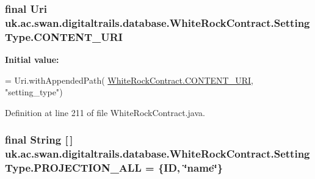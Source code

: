 \hypertarget{classuk_1_1ac_1_1swan_1_1digitaltrails_1_1database_1_1_white_rock_contract_1_1_setting_type_a3041c935f6d354bc72de5e4b1867aa3d}{
\subsubsection[{C\+O\+N\+T\+E\+N\+T\+\_\+\+U\+R\+I}]{\setlength{\rightskip}{0pt plus 5cm}final Uri uk.\+ac.\+swan.\+digitaltrails.\+database.\+White\+Rock\+Contract.\+Setting\+Type.\+C\+O\+N\+T\+E\+N\+T\+\_\+\+U\+R\+I\hspace{0.3cm}{\ttfamily [static]}}}\label{classuk_1_1ac_1_1swan_1_1digitaltrails_1_1database_1_1_white_rock_contract_1_1_setting_type_a3041c935f6d354bc72de5e4b1867aa3d}
{\bfseries Initial value\+:}
\begin{DoxyCode}
= Uri.withAppendedPath(
                \hyperlink{classuk_1_1ac_1_1swan_1_1digitaltrails_1_1database_1_1_white_rock_contract_abfe96759bfe16773a98099536eef2306}{WhiteRockContract.CONTENT\_URI}, \textcolor{stringliteral}{"setting\_type"})
\end{DoxyCode}


Definition at line 211 of file White\+Rock\+Contract.\+java.

\hypertarget{classuk_1_1ac_1_1swan_1_1digitaltrails_1_1database_1_1_white_rock_contract_1_1_setting_type_a634a057f05783b12c2f3f53a022fbee3}{
\subsubsection[{P\+R\+O\+J\+E\+C\+T\+I\+O\+N\+\_\+\+A\+L\+L}]{\setlength{\rightskip}{0pt plus 5cm}final String \mbox{[}$\,$\mbox{]} uk.\+ac.\+swan.\+digitaltrails.\+database.\+White\+Rock\+Contract.\+Setting\+Type.\+P\+R\+O\+J\+E\+C\+T\+I\+O\+N\+\_\+\+A\+L\+L = \{I\+D, \char`\"{}name\char`\"{}\}\hspace{0.3cm}{\ttfamily [static]}}}\label{classuk_1_1ac_1_1swan_1_1digitaltrails_1_1database_1_1_white_rock_contract_1_1_setting_type_a634a057f05783b12c2f3f53a022fbee3}


